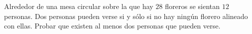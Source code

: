 Alrededor de una mesa circular sobre la que hay $28$ floreros se sientan $12$ personas. Dos personas pueden verse si y sólo si no hay ningún florero alineado con ellas. Probar que existen al menos dos personas que pueden verse.
